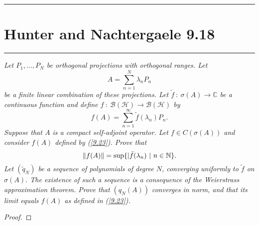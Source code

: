 \documentclass{article} %
\theoremstyle{plain}
\def\Cx{\mathbb{C}}
\newcommand{\Hilb}{\mathcal{H}}
\newcommand{\problem}[1]{
\vspace{.375cm}
\begin{minipage}{\textwidth}
    \begin{center}
        \noindent\rule{5cm}{1pt}
    \end{center}
    \section{\bf #1}
    \begin{center}
        \noindent\rule{5cm}{1pt}
    \end{center}
    \vspace{0.25cm}
\end{minipage}
}
\numberwithin{equation}{section} %
\numberwithin{figure}{section} %
\numberwithin{table}{section} %
\begin{document}
\problem{Hunter and Nachtergaele 9.18}
\emph{Let $P_1, \dots, P_N$ be orthogonal projections with orthogonal ranges.  Let $$A = \sum_{n=1}^N\lambda_n P_n$$ be a finite linear combination of these projections.  Let $\tilde{f}\ :\ \sigma(A) \rightarrow \Cx$ be a continuous function and define $f\ :\ \mathcal{B}(\Hilb) \rightarrow \mathcal{B}(\Hilb)$ by}
\begin{equation}
    \tag{9.23}
    f(A) = \sum_{n=1}^\infty \tilde{f}(\lambda_n)P_n.
    \label{9.23}
\end{equation}
\emph{Suppose that $A$ is a compact self-adjoint operator.  Let $f \in C(\sigma(A))$ and consider $f(A)$ defined by (\ref{9.23}).  Prove that $$\norm{f(A)} = \sup\{|\tilde{f}(\lambda_n)\ |\ n \in \mathbb{N}\}.$$  Let $(\tilde{q}_N)$ be a sequence of polynomials of degree $N$, converging uniformly to $\tilde{f}$ on $\sigma(A)$.  The existence of such a sequence is a consequence of the Weierstrass approximation theorem.  Prove that $(q_N(A))$ converges in norm, and that its limit equals $f(A)$ as defined in (\ref{9.23}).}
\begin{proof}
\end{proof}
\end{document}
